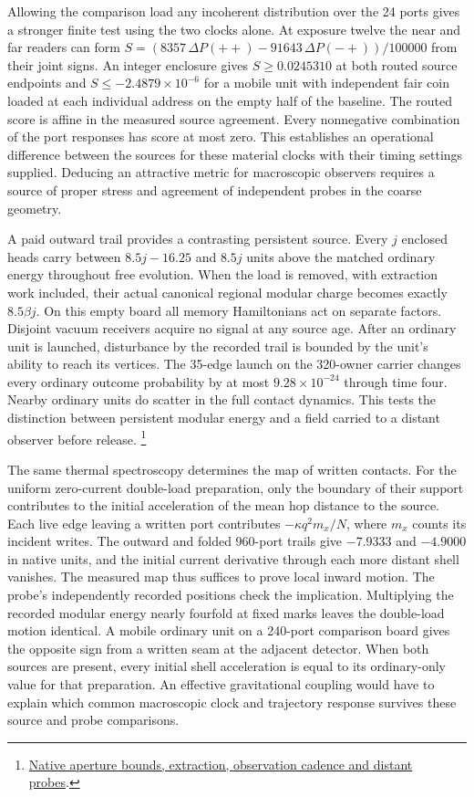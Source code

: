 \documentclass[11pt]{article}
\begin{document}
Allowing the comparison load any incoherent distribution over the 24 ports
gives a stronger finite test using the two clocks alone. At exposure
twelve the near and far readers can form
$S=(8357\,\Delta P(++)-91643\,\Delta P(-+))/100000$ from their joint signs.
An integer enclosure gives $S\ge0.0245310$ at both routed source endpoints
and $S\le-2.4879\times10^{-6}$ for a mobile unit with independent fair
coin loaded at each individual address on the empty half of the baseline.
The routed score is affine in the measured source agreement. Every
nonnegative combination of the port responses has score at most zero.
This establishes an operational difference between the sources for
these material clocks with their timing settings supplied. Deducing an
attractive metric for macroscopic observers requires a source of proper
stress and agreement of independent probes in the coarse geometry.

A paid outward trail provides a contrasting persistent source. Every
$j$ enclosed heads carry between $8.5j-16.25$ and $8.5j$ units above
the matched ordinary energy throughout free evolution. When the load
is removed, with extraction work included, their actual canonical
regional modular charge becomes exactly $8.5\beta j$. On this empty
board all memory Hamiltonians act on separate factors. Disjoint
vacuum receivers acquire no signal at any source age. After an ordinary
unit is launched, disturbance by the recorded trail is bounded by the
unit's ability to reach its vertices. The 35-edge launch on the
320-owner carrier changes every ordinary outcome probability by at
most $9.28\times10^{-24}$ through time four. Nearby ordinary units
do scatter in the full contact dynamics. This tests the distinction
between persistent modular energy and a field carried to a distant
observer before release.%
\footnote{\href{https://github.com/FloatingPragma/observer-patch-holography/tree/main/model/experiments/interval_echo_shell_flux/product_address/green_response/material_recoil/overlap_source/native_boundary/stock/aperture}{Native aperture bounds, extraction, observation cadence and distant probes}.}

The same thermal spectroscopy determines the map of written contacts.
For the uniform zero-current double-load preparation, only the boundary
of their support contributes to the initial acceleration of the mean hop
distance to the source. Each live edge leaving a written port contributes
$-\kappa q^2 m_x/N$, where $m_x$ counts its incident writes. The outward
and folded 960-port trails give $-7.9333$ and $-4.9000$ in native units,
and the initial current derivative through each more distant shell
vanishes. The measured map thus suffices to prove local inward motion.
The probe's independently recorded positions check the implication.
Multiplying the recorded modular energy nearly fourfold at fixed marks
leaves the double-load motion identical. A mobile ordinary unit on a
240-port comparison board gives the opposite sign from a written seam
at the adjacent detector. When both sources are present, every initial
shell acceleration is equal to its ordinary-only value for that
preparation. An effective gravitational coupling would have to explain
which common macroscopic clock and trajectory response survives these
source and probe comparisons.
\end{document}
